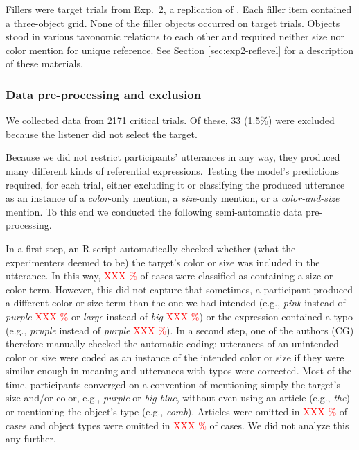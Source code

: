 \documentclass[11pt]{article}
\newcommand{\red}[1]{\textcolor{Red}{#1}}
\newcommand{\sectionref}[1]{Section \ref{#1}}
\begin{document}
Fillers were target trials from Exp.~2, a replication of \cite{graf2016}. Each filler item contained a three-object grid. None of the filler objects occurred on target trials. Objects stood in various taxonomic relations to each other and required neither size nor color mention for unique reference. See \sectionref{sec:exp2-reflevel} for a description of these materials.

\subsubsection{Data pre-processing and exclusion}

We collected data from 2171 critical trials. Of these, 33 (1.5\%) were excluded because the listener did not select the target. 

Because we did not restrict participants' utterances in any way, they produced many different kinds of referential expressions. Testing the model's predictions required, for each trial, either excluding it or classifying the produced utterance as an instance of a \emph{color}-only mention, a \emph{size}-only mention, or a \emph{color-and-size} mention. To this end we conducted the following semi-automatic data pre-processing. 

In a first step, an R script automatically checked whether (what the experimenters deemed to be) the target's color or size was included in the utterance. In this way, \red{XXX \%} of cases were classified as containing a size or color term. However, this did not capture that sometimes, a participant produced a different color or size term than the one we had intended (e.g., \emph{pink} instead of \emph{purple} \red{XXX \%} or \emph{large} instead of \emph{big} \red{XXX \%}) or the expression contained a typo (e.g., \emph{pruple} instead of \emph{purple} \red{XXX \%}). In a second step, one of the authors (CG) therefore manually checked the automatic coding: utterances of an unintended color or size were coded as an instance of the intended color or size if they were similar enough in meaning and utterances with typos were corrected.   Most of the time, participants converged on a convention of mentioning simply the target's size and/or color, e.g., \emph{purple} or \emph{big blue}, without even using an article (e.g., \emph{the}) or mentioning the object's type (e.g., \emph{comb}). Articles were omitted in \red{XXX \%} of cases and object types were omitted in \red{XXX \%} of cases. We did not analyze this any further.
\end{document}
